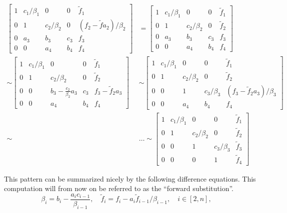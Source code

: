 \documentclass[10pt, a4paper]{amsart}
\begin{document}
\begin{align}
\left[
\begin{array}{cccc|c}
1 & c_1/\beta_1 & 0 & 0 & \tilde{f}_1 \\
0 & 1 & c_2/\beta_2 & 0  & (f_2-\tilde{f}a_2)/\beta_2 \\
0 & a_3 & b_3 & c_3 & f_3 \\
0 & 0 & a_4 & b_4 & f_4
\end{array}
\right] &=
\left[
\begin{array}{cccc|c}
1 & c_1/\beta_1 & 0 & 0 & \tilde{f}_1 \\
0 & 1 & c_2/\beta_2 & 0  & \tilde{f}_2 \\
0 & a_3 & b_3 & c_3 & f_3 \\
0 & 0 & a_4 & b_4 & f_4
\end{array}
\right] \\ \sim 
\left[
\begin{array}{cccc|c}
1 & c_1/\beta_1 & 0 & 0 & \tilde{f}_1 \\
0 & 1 & c_2/\beta_2 & 0  & \tilde{f}_2 \\
0 & 0 & b_3-\frac{c_2}{\beta_2}a_3 & c_3 & f_3-\tilde{f}_2a_3 \\
0 & 0 & a_4 & b_4 & f_4
\end{array}
\right] &\sim 
\left[
\begin{array}{cccc|c}
1 & c_1/\beta_1 & 0 & 0 & \tilde{f}_1 \\
0 & 1 & c_2/\beta_2 & 0  & \tilde{f}_2 \\
0 & 0 & 1 & c_3/\beta_3 & (f_3-\tilde{f}_2a_3)/\beta_3 \\
0 & 0 & a_4 & b_4 & f_4
\end{array}\right] \\ 
\sim &\dots \sim
\left[
\begin{array}{cccc|c}
1 & c_1/\beta_1 & 0 & 0 & \tilde{f}_1 \\
0 & 1 & c_2/\beta_2 & 0  & \tilde{f}_2 \\
0 & 0 & 1 & c_3/\beta_3 & \tilde{f}_3 \\
0 & 0 & 0 & 1 & \tilde{f}_4
\end{array}
\right]
\end{align}

This pattern can be summarized nicely by the following
difference equations. This computation will from now on be referred to
as the ``forward substitution''. 
\begin{equation}
\label{eq:forward1}
\beta_i=b_i-\frac{a_ic_{i-1}}{\beta_{i-1}}, \quad
\tilde{f}_i=f_i-a_i\tilde{f}_{i-1}/\beta_{i-1}, \quad i \in [2,n], \quad
\end{equation}
\end{document}

